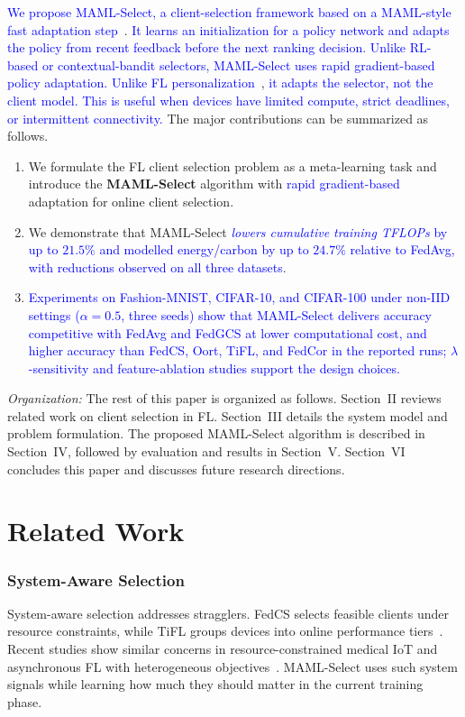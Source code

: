 \documentclass[journal]{IEEEtran}
\newcommand{\revision}[1]{\textcolor{blue}{#1}}
\begin{document}
\revision{We propose MAML-Select, a client-selection framework based on a MAML-style fast adaptation step}~\cite{finn2017model}. \revision{It learns an initialization for a policy network and adapts the policy from recent feedback before the next ranking decision. Unlike RL-based or contextual-bandit selectors, MAML-Select uses rapid gradient-based policy adaptation. Unlike FL personalization}~\cite{fallah2020personalized}, \revision{it adapts the selector, not the client model. This is useful when devices have limited compute, strict deadlines, or intermittent connectivity.} The major contributions can be summarized as follows.
\begin{enumerate}
\setlength{\itemsep}{0pt}
\setlength{\topsep}{1pt}
		\item We formulate the FL client selection problem as a meta-learning task and introduce the \textbf{MAML-Select} algorithm with \revision{rapid gradient-based} adaptation for online client selection.
		\item We demonstrate that MAML-Select \revision{\textit{lowers cumulative training TFLOPs} by up to $21.5\%$ and modelled energy/carbon by up to $24.7\%$ relative to FedAvg, with reductions observed on all three datasets}.
	\item \revision{Experiments on Fashion-MNIST, CIFAR-10, and CIFAR-100 under non-IID settings ($\alpha = 0.5$, three seeds) show that MAML-Select delivers accuracy competitive with FedAvg and FedGCS at lower computational cost, and higher accuracy than FedCS, Oort, TiFL, and FedCor in the reported runs; $\lambda$-sensitivity and feature-ablation studies support the design choices.}
\end{enumerate}

\textit{Organization:} The rest of this paper is organized as follows. Section~II reviews related work on client selection in FL. Section~III details the system model and problem formulation. The proposed MAML-Select algorithm is described in Section~IV, followed by evaluation and results in Section~V. Section~VI concludes this paper and discusses future research directions.

\section{Related Work}
\subsubsection{System-Aware Selection}
System-aware selection addresses stragglers. FedCS selects feasible clients under resource constraints, while TiFL groups devices into online performance tiers~\cite{nishio2019client,chai2020tifl}. Recent studies show similar concerns in resource-constrained medical IoT and asynchronous FL with heterogeneous objectives~\cite{tapwal2026stragglers,forootani2026asynchronous}. MAML-Select uses such system signals while learning how much they should matter in the current training phase.
\end{document}
